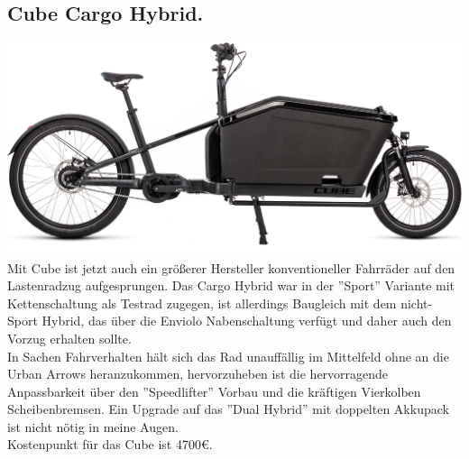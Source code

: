 \documentclass[a4paper,ngerman, 14pt] {scrartcl}
\begin{document}
\subsection{Cube Cargo Hybrid.}
\includegraphics[scale=0.36]{cube_cargo_hybrid.jpg}\\
Mit Cube ist jetzt auch ein größerer Hersteller konventioneller Fahrräder auf den Lastenradzug aufgesprungen. Das Cargo Hybrid war in der ''Sport'' Variante mit Kettenschaltung als Testrad zugegen, ist allerdings Baugleich mit dem nicht-Sport Hybrid, das über die Enviolo Nabenschaltung verfügt und daher auch den Vorzug erhalten sollte.\\
In Sachen Fahrverhalten hält sich das Rad unauffällig im Mittelfeld ohne an die Urban Arrows heranzukommen, hervorzuheben ist die hervorragende Anpassbarkeit über den ''Speedlifter'' Vorbau und die kräftigen Vierkolben Scheibenbremsen. Ein Upgrade auf das ''Dual Hybrid'' mit doppelten Akkupack ist nicht nötig in meine Augen.\\
Kostenpunkt für das Cube ist 4700€.
\end{document}
